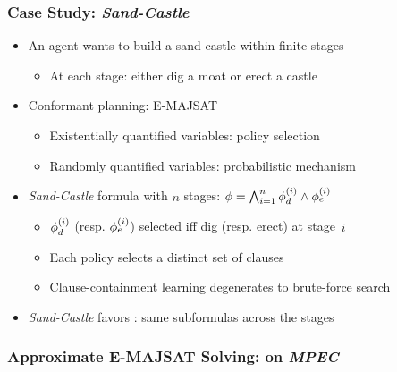 \begin{frame}
    \frametitle{Case Study: \textit{Sand-Castle}}
    \begin{itemize}
        \item An agent wants to build a sand castle within finite stages
              \pause
              \begin{itemize}
                  \item At each stage: either dig a moat or erect a castle
                        \pause
              \end{itemize}
        \item Conformant planning: E-MAJSAT
              \pause
              \begin{itemize}
                  \item Existentially quantified variables: policy selection
                        \pause
                  \item Randomly quantified variables: probabilistic mechanism
                        \pause
              \end{itemize}
        \item \textit{Sand-Castle} formula with $n$ stages: $\phi=\bigwedge_{i=1}^n \phi_d^{(i)}\land\phi_e^{(i)}$
              \pause
              \begin{itemize}
                  \item $\phi_d^{(i)}$ (resp. $\phi_e^{(i)}$) selected iff dig (resp. erect) at stage~$i$
                        \pause
                  \item Each policy selects a distinct set of clauses
                        \pause
                  \item Clause-containment learning degenerates to brute-force search
                        \pause
              \end{itemize}
        \item \textit{Sand-Castle} favors \dcssat: same subformulas  across the stages
    \end{itemize}
\end{frame}

\begin{frame}
    \frametitle{Approximate E-MAJSAT Solving: \erssat on \textit{MPEC}}
    \begin{table}[ht]
        \centering
        \scriptsize
    \end{table}
\end{frame}


